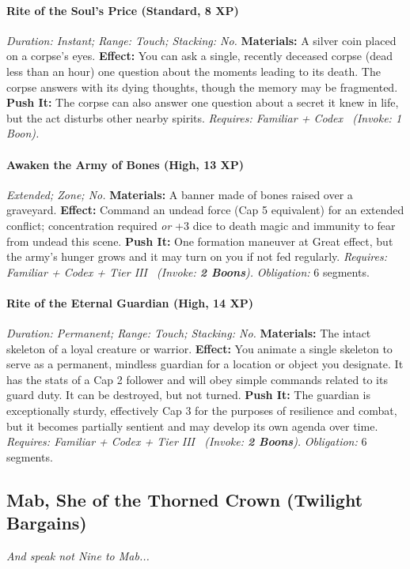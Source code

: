 \documentclass[12pt,twoside]{book}
\begin{document}
\paragraph{Rite of the Soul's Price (Standard, 8 XP)} \emph{Duration: Instant; Range: Touch; Stacking: No.}
\textbf{Materials:} A silver coin placed on a corpse's eyes.
\textbf{Effect:} You can ask a single, recently deceased corpse (dead less than an hour) one question about the moments leading to its death. The corpse answers with its dying thoughts, though the memory may be fragmented.
\textbf{Push It:} The corpse can also answer one question about a secret it knew in life, but the act disturbs other nearby spirits.
\emph{Requires: Familiar + Codex \ (\textit{Invoke:} 1 Boon).}
\paragraph{Awaken the Army of Bones (High, 13 XP)} \emph{Extended; Zone; No.}
\textbf{Materials:} A banner made of bones raised over a graveyard.
\textbf{Effect:} Command an undead force (Cap 5 equivalent) for an extended conflict; concentration required \emph{or} +3 dice to death magic and immunity to fear from undead this scene.
\textbf{Push It:} One formation maneuver at Great effect, but the army's hunger grows and it may turn on you if not fed regularly.
\emph{Requires: Familiar + Codex + Tier III \ (\textit{Invoke:} \textbf{2 Boons}).}
\emph{Obligation:} 6 segments.

\paragraph{Rite of the Eternal Guardian (High, 14 XP)} \emph{Duration: Permanent; Range: Touch; Stacking: No.}
\textbf{Materials:} The intact skeleton of a loyal creature or warrior.
\textbf{Effect:} You animate a single skeleton to serve as a permanent, mindless guardian for a location or object you designate. It has the stats of a Cap 2 follower and will obey simple commands related to its guard duty. It can be destroyed, but not turned.
\textbf{Push It:} The guardian is exceptionally sturdy, effectively Cap 3 for the purposes of resilience and combat, but it becomes partially sentient and may develop its own agenda over time.
\emph{Requires: Familiar + Codex + Tier III \ (\textit{Invoke:} \textbf{2 Boons}).}
\emph{Obligation:} 6 segments.

\subsection{Mab, She of the Thorned Crown (Twilight Bargains)}
\textit{And speak not Nine to Mab...}
\end{document}
